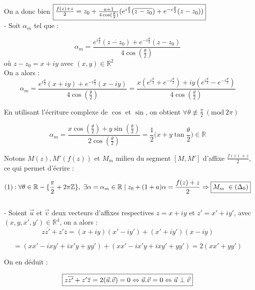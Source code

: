 \documentclass{article}
\begin{document}
     On a donc bien $\fbox{$\frac{f(z) + z}{2} = z_0 + \frac{a + 1}{4 \cos(\frac{\theta}{2})} (e^{i\frac{\theta}{2}} (\overline{z - z_0}) + 
     e^{-i\frac{\theta}{2}} (z - z_0)) $}$\\


     - Soit $\alpha_m$ tel que : 
     
     $$\alpha_m = \frac{e^{i\frac{\theta}{2}} (\overline{z - z_0}) + e^{-i\frac{\theta}{2}} (z - z_0)}{4 \cos(\frac{\theta}{2})}$$
     où $z - z_0 = x + iy$ avec $(x, y) \in \mathbb{R}^{2}$\\
     
     On a alors : 
     $$\alpha_m = \frac{e^{i\frac{\theta}{2}} (x + iy) + e^{-i\frac{\theta}{2}} (x - iy)}{4 \cos(\frac{\theta}{2})}
     =
     \frac{x(e^{i\frac{\theta}{2}} + e^{-i\frac{\theta}{2}}) +iy(e^{i\frac{\theta}{2}} - e^{-i\frac{\theta}{2}})}{4 \cos(\frac{\theta}{2})}
     $$

     En utilisant l'écriture complexe de $\cos$ et $\sin$, on obtient $\forall \theta \not \equiv \frac{\pi}{2}\ (\textrm{mod}\ 2\pi)$

     $$\alpha_m = \frac{x\cos(\frac{\theta}{2}) + y\sin(\frac{\theta}{2})}{2 \cos(\frac{\theta}{2})}
     =
     \frac{1}{2} (x + y \tan{\frac{\theta}{2})} \in \mathbb{R}$$

     Notons $M(z), M'(f(z))$ et $M_m$ milieu du segment $[M, M']$ d'affixe $\frac{f(z) + z}{2}$, ce qui permet d'écrire : 

     $$(1) : \forall \theta \in \mathbb{R} - \{\frac{\pi}{2} + 2\pi\mathbb{Z}\}, \ \exists \alpha = \alpha_m \in \mathbb{R}
     \mid z_0 + (1 + a) \alpha = \frac{f(z) + z}{2} \Rightarrow \fbox{$M_m \in (\Delta_0)$}$$\\

    - Soient $\vec{u}$ et $\vec{v}$ deux vecteurs d'affixes respectives $z = x + iy$ et $z' = x' + iy'$, avec $(x, y, x', y') \in \mathbb{R}^{4}$, on a alors : \\

    $$z \overline{z'} + z' \overline{z} = (x + iy) (x' - iy') + (x' + iy') (x - iy)$$

    $$ = (xx' - ixy' + ix'y + yy') + (xx' - ix'y + ixy' + yy') = 2(xx' + yy')$$

    On en déduit :

    $$\fbox{$z \overline{z'} + z' \overline{z} = 2(\vec{u}.\vec{v}) = 0 \Leftrightarrow \vec{u}.\vec{v} = 0 
    \Leftrightarrow \vec{u} \perp \vec{v}$}$$

    \newpage
\end{document}
